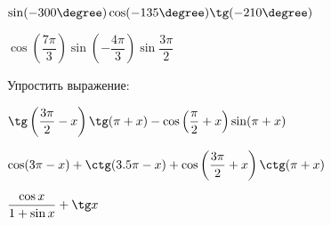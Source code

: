 \begin{class}[number=5]
\begin{listofex}
\begin{enumcols}[itemcolumns=2]
			\item \( \sin(-300\degree)\cos(-135\degree)\tg(-210\degree) \)
			\item \( \cos\left( \dfrac{7\pi}{3} \right)\sin\left( -\dfrac{4\pi}{3} \right)\sin\dfrac{3\pi}{2} \)
		\end{enumcols}
		\item Упростить выражение:
		\begin{enumcols}[itemcolumns=1]
			\item \( \tg\left( \dfrac{3\pi}{2}-x \right)\tg(\pi+x)-\cos\left( \dfrac{\pi}{2}+x \right)\sin(\pi+x) \)
			\item \( \cos(3\pi-x)+\ctg(3.5\pi-x)+\cos\left( \dfrac{3\pi}{2}+x \right)\ctg(\pi+x) \)
			\item \( \dfrac{\cos x}{1+\sin x}+\tg x \)
		\end{enumcols}
		\item {}
		\item {}
	\end{listofex}
\end{class}
%
%
%	
%
%
%
%	
%
%
%	
%
%
%	
